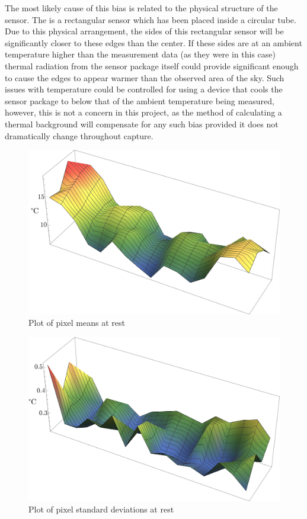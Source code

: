 \documentclass[../thesis/thesis.tex]{subfiles}
\begin{document}
The most likely cause of this bias is related to the physical structure of the sensor. The \mlx is a rectangular sensor which has been placed inside a circular tube. Due to this physical arrangement, the sides of this rectangular sensor will be significantly closer to these edges than the center. If these sides are at an ambient temperature higher than the measurement data (as they were in this case) thermal radiation from the sensor package itself could provide significant enough to cause the edges to appear warmer than the observed area of the sky. Such issues with temperature could be controlled for using a device that cools the sensor package to below that of the ambient temperature being measured, however, this is not a concern in this project, as the method of calculating a thermal background will compensate for any such bias provided it does not dramatically change throughout capture.

\begin{figure}
\centering
\includegraphics[width=\textwidth]{../diagrams/rest-avg.png}
\caption{Plot of pixel means at rest}
\label{fig:meanplot}
\end{figure}

\begin{figure}
\centering
\includegraphics[width=\textwidth]{../diagrams/rest-stddev.png}
\caption{Plot of pixel standard deviations at rest}
\label{fig:stdplot}
\end{figure}
\end{document}
